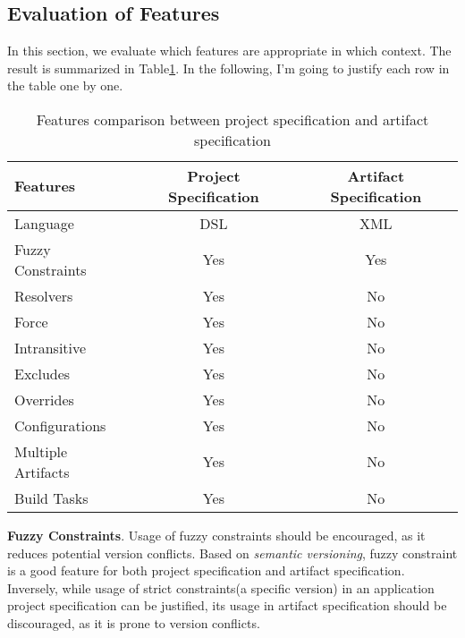 \subsection{Evaluation of Features}

In this section, we evaluate which features are appropriate in which context. The result is summarized in Table\ref{table:prag:features}. In the following, I'm going to justify each row in the table one by one.

\begin{table}
  \center
  \begin{tabular}{|l|c|c|}
    \hline
    Features              & Project Specification & Artifact Specification \\
    \hline
    Language              &   DSL                 & XML \\
    Fuzzy Constraints     &   Yes                 & Yes \\
    Resolvers             &   Yes                 & No \\
    Force                 &   Yes                 & No \\
    Intransitive          &   Yes                 & No \\
    Excludes              &   Yes                 & No \\
    Overrides             &   Yes                 & No \\
    Configurations        &   Yes                 & No \\
    Multiple Artifacts    &   Yes                 & No \\
    Build Tasks           &   Yes                 & No \\
    \hline
  \end{tabular}
  \caption[Features Comparison]{Features comparison between project specification and artifact specification \label{table:prag:features}}
\end{table}

\textbf{Fuzzy Constraints}. Usage of fuzzy constraints should be encouraged, as it reduces potential version conflicts. Based on \emph{semantic versioning}, fuzzy constraint is a good feature for both project specification and artifact specification. Inversely, while usage of strict constraints(a specific version) in an application project specification can be justified, its usage in artifact specification should be discouraged, as it is prone to version conflicts.

